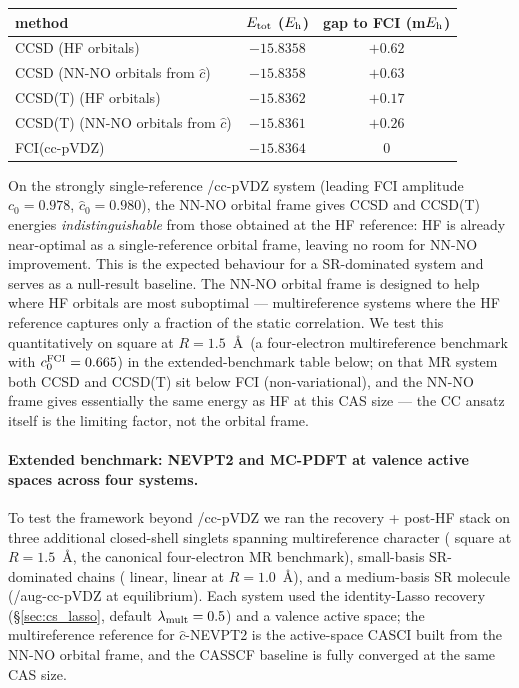\documentclass[journal=jctcce,manuscript=article,layout=traditional]{achemso}
\begin{document}
\begin{center}\renewcommand{\arraystretch}{1.05}\small
\begin{tabular}{lcc}
\toprule
method                                  & $E_{\rm tot}$ ($E_{\rm h}$) & gap to FCI (m$E_{\rm h}$) \\
\midrule
CCSD  (HF orbitals)                     & $-15.8358$ & $+0.62$ \\
CCSD  (NN-NO orbitals from $\widehat c$) & $-15.8358$ & $+0.63$ \\
CCSD(T) (HF orbitals)                   & $-15.8362$ & $+0.17$ \\
CCSD(T) (NN-NO orbitals from $\widehat c$) & $-15.8361$ & $+0.26$ \\
\midrule
FCI(cc-pVDZ)                            & $-15.8364$ & 0 \\
\bottomrule
\end{tabular}
\end{center}

\noindent On the strongly single-reference /cc-pVDZ system
(leading FCI amplitude $c_0 = 0.978$, $\widehat c_0 = 0.980$), the
NN-NO orbital frame gives CCSD and CCSD(T) energies
\emph{indistinguishable} from those obtained at the HF reference: HF
is already near-optimal as a single-reference orbital frame, leaving
no room for NN-NO improvement. This is the expected behaviour for a
SR-dominated system and serves as a null-result baseline. The NN-NO
orbital frame is designed to help where HF orbitals are most
suboptimal --- multireference systems where the HF reference
captures only a fraction of the static correlation. We test this
quantitatively on  square at $R=1.5$~\AA\ (a four-electron
multireference benchmark with $c_0^{\rm FCI} = 0.665$) in the
extended-benchmark table below; on that MR system both
CCSD and CCSD(T) sit below FCI (non-variational), and the NN-NO
frame gives essentially the same energy as HF at this CAS size ---
the CC ansatz itself is the limiting factor, not the orbital frame.

\paragraph{Extended benchmark: NEVPT2 and MC-PDFT at valence active
spaces across four systems.} To test the framework beyond
/cc-pVDZ we ran the recovery + post-HF stack on three
additional closed-shell singlets spanning multireference character
( square at $R=1.5$~\AA, the canonical four-electron MR
benchmark), small-basis SR-dominated chains ( linear,
 linear at $R=1.0$~\AA), and a medium-basis SR molecule
(/aug-cc-pVDZ at equilibrium). Each system used the
identity-Lasso recovery (\S\ref{sec:cs_lasso}, default
$\lambda_{\rm mult} = 0.5$) and a valence active space; the
multireference reference for $\widehat c$-NEVPT2 is the active-space
CASCI built from the NN-NO orbital frame, and the CASSCF baseline is
fully converged at the same CAS size.
\end{document}
